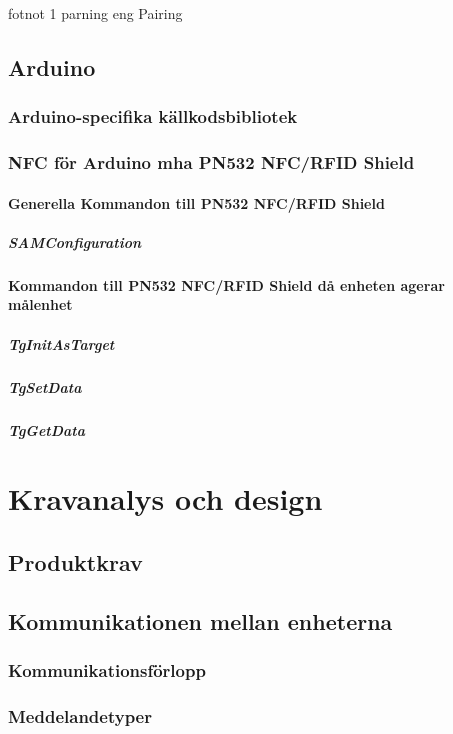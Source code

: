 \documentclass[11pt]{article}
\begin{document}
fotnot 1 parning eng Pairing

\subsection{Arduino}

\subsubsection{Arduino-specifika källkodsbibliotek}

\subsubsection{NFC för Arduino mha PN532 NFC/RFID Shield}

\paragraph{Generella Kommandon till PN532 NFC/RFID Shield}

\subparagraph{SAMConfiguration}

\paragraph{Kommandon till PN532 NFC/RFID Shield då enheten agerar målenhet}

\subparagraph{TgInitAsTarget}

\subparagraph{TgSetData}

\subparagraph{TgGetData}

\section{Kravanalys och design}

\subsection{Produktkrav}

\subsection{Kommunikationen mellan enheterna}

\subsubsection{Kommunikationsförlopp}

\subsubsection{Meddelandetyper}
\end{document}
